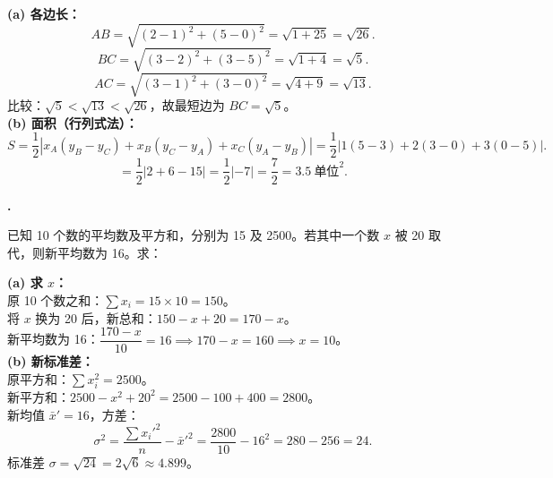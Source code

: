 \documentclass[12pt,a4paper]{ctexart}
\newcounter{qnum}
\newenvironment{question}
  {%
    \stepcounter{qnum}%
    \vspace{0.8em}%
    \noindent\textbf{\theqnum.}\enspace
  }
  {\par\vspace{0.4em}}
\newenvironment{solution}
  {%
    \par\noindent
  }
  {\par}
\begin{document}
\begin{solution}
    \textbf{(a) 各边长：} \\
    \[
        AB = \sqrt{(2-1)^2+(5-0)^2} = \sqrt{1+25} = \sqrt{26}.
    \]
    \[
        BC = \sqrt{(3-2)^2+(3-5)^2} = \sqrt{1+4} = \sqrt{5}.
    \]
    \[
        AC = \sqrt{(3-1)^2+(3-0)^2} = \sqrt{4+9} = \sqrt{13}.
    \]
    比较：$\sqrt{5} < \sqrt{13} < \sqrt{26}$，故最短边为 $BC = \sqrt{5}$。\\

    \textbf{(b) 面积（行列式法）：} \\
    \[
        S = \frac{1}{2}\left|x_A(y_B - y_C) + x_B(y_C - y_A) + x_C(y_A - y_B)\right|
        = \frac{1}{2}\left|1(5-3)+2(3-0)+3(0-5)\right|.
    \]
    \[
        = \frac{1}{2}\left|2 + 6 - 15\right| = \frac{1}{2}|-7| = \frac{7}{2} = 3.5\ \text{单位}^2.
    \]
\end{solution}

\begin{question}
    已知 10 个数的平均数及平方和，分别为 15 及 2500。若其中一个数 $x$ 被 20 取代，则新平均数为 16。求：
\end{question}

\begin{solution}
    \textbf{(a) 求 $x$：} \\
    原 10 个数之和：$\sum x_i = 15 \times 10 = 150$。\\
    将 $x$ 换为 20 后，新总和：$150 - x + 20 = 170 - x$。\\
    新平均数为 16：$\dfrac{170-x}{10} = 16 \implies 170 - x = 160 \implies x = 10$。\\

    \textbf{(b) 新标准差：} \\
    原平方和：$\sum x_i^2 = 2500$。\\
    新平方和：$2500 - x^2 + 20^2 = 2500 - 100 + 400 = 2800$。\\
    新均值 $\bar{x}' = 16$，方差：
    \[
        \sigma^2 = \frac{\sum x_i'^2}{n} - \bar{x}'^2 = \frac{2800}{10} - 16^2 = 280 - 256 = 24.
    \]
    标准差 $\sigma = \sqrt{24} = 2\sqrt{6} \approx 4.899$。
\end{solution}
\end{document}
